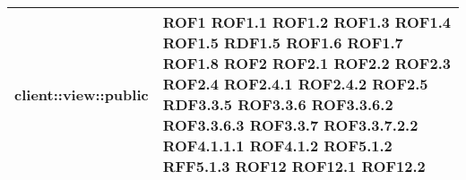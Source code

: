 \begin{center}
\begin{longtable}{| p{9cm} | p{4cm} |}
client::view::public  &  ROF1 \newline ROF1.1 \newline ROF1.2 \newline ROF1.3 \newline ROF1.4 \newline ROF1.5 \newline RDF1.5 \newline ROF1.6 \newline ROF1.7 \newline ROF1.8 \newline ROF2 \newline ROF2.1 \newline ROF2.2 \newline ROF2.3 \newline ROF2.4 \newline ROF2.4.1 \newline ROF2.4.2 \newline ROF2.5 \newline RDF3.3.5 \newline ROF3.3.6 \newline ROF3.3.6.2 \newline ROF3.3.6.3  \newline ROF3.3.7 \newline ROF3.3.7.2.2 \newline ROF4.1.1.1 \newline ROF4.1.2 \newline ROF5.1.2 \newline RFF5.1.3 \newline ROF12 \newline ROF12.1 \newline ROF12.2 \newline \\
\hline

\end{longtable}
\end{center}
